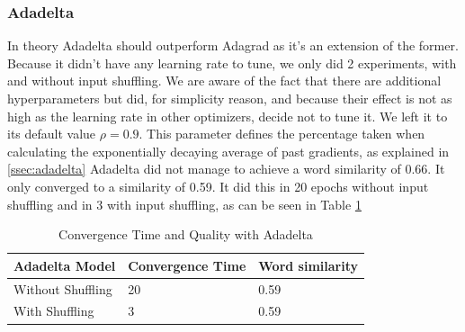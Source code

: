 \documentclass[conference]{IEEEtran}
\begin{document}
\subsubsection{Adadelta}
In theory Adadelta \cite{adadelta} should outperform Adagrad as it's an extension of the former. Because it didn't have any learning rate to tune, we only did 2 experiments, with and without input shuffling. We are aware of the fact that there are additional hyperparameters but did, for simplicity reason, and because their effect is not as high as the learning rate in other optimizers, decide not to tune it. We left it to its default value $\rho = 0.9$. This parameter defines the percentage taken when calculating the exponentially decaying average of past gradients, as explained in \ref{ssec:adadelta} Adadelta did not manage to achieve a word similarity of 0.66. It only converged to a similarity of 0.59. It did this in 20 epochs without input shuffling and in 3 with input shuffling, as can be seen in Table \ref{table:results_adadelta}
\begin{table}[h]
\centering
\begin{tabular}{|l|l|l|}
\hline
Adadelta Model & Convergence Time & Word similarity \\ \hline
Without Shuffling & 20 & 0.59 \\ \hline
With Shuffling & 3 & 0.59 \\ \hline
\end{tabular}
\caption{Convergence Time and Quality with Adadelta}
\label{table:results_adadelta}
\end{table}
\end{document}
